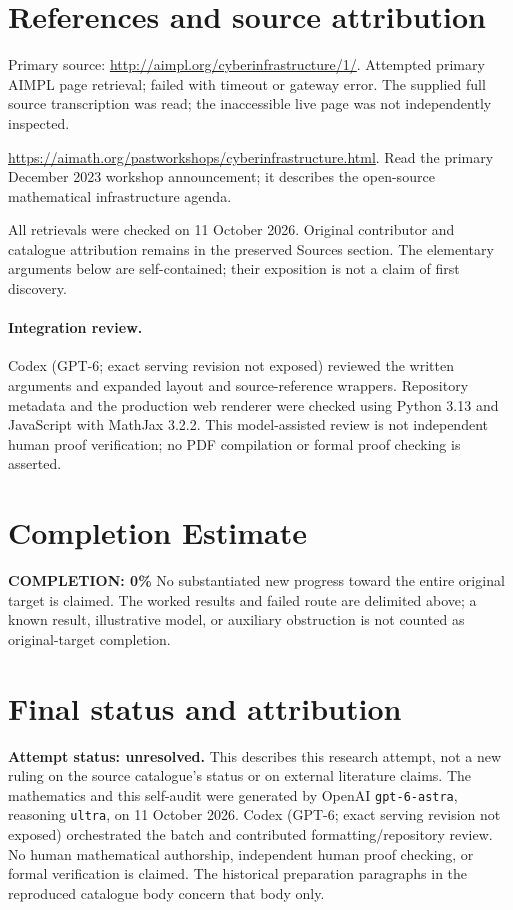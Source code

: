 \documentclass[11pt]{article}
\begin{document}
\section{References and source attribution}
Primary source: \url{http://aimpl.org/cyberinfrastructure/1/}. Attempted primary AIMPL page retrieval; failed with timeout or gateway error. The supplied full source transcription was read; the inaccessible live page was not independently inspected.

\url{https://aimath.org/pastworkshops/cyberinfrastructure.html}. Read the primary December 2023 workshop announcement; it describes the open-source mathematical infrastructure agenda.

All retrievals were checked on 11 October 2026. Original contributor and catalogue attribution remains in the preserved Sources section. The elementary arguments below are self-contained; their exposition is not a claim of first discovery.


\paragraph{Integration review.} Codex (GPT-6; exact serving revision not exposed) reviewed the written arguments and expanded layout and source-reference wrappers. Repository metadata and the production web renderer were checked using Python 3.13 and JavaScript with MathJax 3.2.2. This model-assisted review is not independent human proof verification; no PDF compilation or formal proof checking is asserted.

\section{Completion Estimate}
\noindent\textbf{COMPLETION: 0\%}
No substantiated new progress toward the entire original target is claimed. The worked results and failed route are delimited above; a known result, illustrative model, or auxiliary obstruction is not counted as original-target completion.

\section{Final status and attribution}
\textbf{Attempt status: unresolved.} This describes this research attempt, not a new ruling on the source catalogue's status or on external literature claims.
The mathematics and this self-audit were generated by OpenAI \texttt{gpt-6-astra}, reasoning \texttt{ultra}, on 11 October 2026. Codex (GPT-6; exact serving revision not exposed) orchestrated the batch and contributed formatting/repository review. No human mathematical authorship, independent human proof checking, or formal verification is claimed. The historical preparation paragraphs in the reproduced catalogue body concern that body only.
\end{document}
